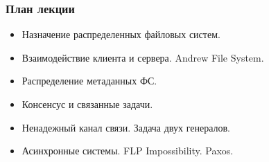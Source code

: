 \begin{frame}
\frametitle{План лекции}
\begin{itemize}
  \item Назначение распределенных файловых систем.
  \item Взаимодействие клиента и сервера. Andrew File System.
  \item Распределение метаданных ФС.
  \item Консенсус и связанные задачи.
  \item Ненадежный канал связи. Задача двух генералов.
  \item Асинхронные системы. FLP Impossibility. Paxos.
\end{itemize}
\end{frame}
